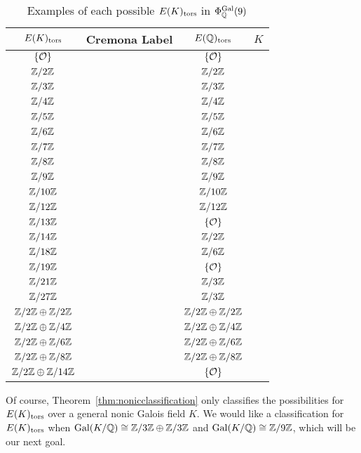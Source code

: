 	\begin{table}[!ht]
	\centering
	\caption{Examples of each possible $E(K)_\tors$ in $\Phi_\Q^{\Gal}(9)$\label{tab:completenoniclist}}
	\begin{tabular}{cccc} \hline
	 $E(K)_\tors$ & Cremona Label & $E(\Q)_\tors$ & $K$ \\ \hline
	$\{ \cO \}$ & \ooat{} & $\{ \cO \}$ & \qzetantp{} \\
	$\Z/2\Z$ & \ffafiv{} & $\Z/2\Z$ & \qzetantp{} \\
	$\Z/3\Z$ & \onao{} & $\Z/3\Z$ & \qzetantp{} \\
	$\Z/4\Z$ & \ofas{} & $\Z/4\Z$ & \qzetantp{} \\
	$\Z/5\Z$ & \ooao{} & $\Z/5\Z$ & \qzetantp{} \\
	$\Z/6\Z$ & \ofat{} & $\Z/6\Z$ & \qzetantp{} \\
	$\Z/7\Z$ & \tsbo{} & $\Z/7\Z$ & \qzetantp{} \\
	$\Z/8\Z$ & \ffafo{} & $\Z/8\Z$ & \qzetantp{} \\
	$\Z/9\Z$ & \ffbt{} & $\Z/9\Z$ & \qzetantp{} \\
	$\Z/10\Z$ & \ssco{} & $\Z/10\Z$ & \qzetantp{} \\
	$\Z/12\Z$ & \nzct{} & $\Z/12\Z$ & \qzetantp{} \\
	$\Z/13\Z$ & \ofsbo{} & $\{ \cO \}$ & \qzetantp{} \\
	$\Z/14\Z$ & \fnaf{} & $\Z/2\Z$ & \qzetantp{} \\
	$\Z/18\Z$ & \tszsozot{} & $\Z/6\Z$ & \nnezsb{} \\
	$\Z/19\Z$ & \tsoao{} & $\{ \cO \}$ & \qzetantp{} \\
	$\Z/21\Z$ & \ostbo{} & $\Z/3\Z$ & \nnstfttf{} \\
	$\Z/27\Z$ & \tsaf{} & $\Z/3\Z$ & \qzetatsp{} \\
	$\Z/2\Z \oplus \Z/2\Z$ & \ffat{} & $\Z/2\Z \oplus \Z/2\Z$ & \qzetantp{} \\
	$\Z/2\Z \oplus \Z/4\Z$ & \ffao{} & $\Z/2\Z \oplus \Z/4\Z$ & \qzetantp{} \\
	$\Z/2\Z \oplus \Z/6\Z$ & \tzat{} & $\Z/2\Z \oplus \Z/6\Z$ & \qzetantp{} \\
	$\Z/2\Z \oplus \Z/8\Z$ & \tozet{} & $\Z/2\Z \oplus \Z/8\Z$ & \qzetantp{} \\
	$\Z/2\Z \oplus \Z/14\Z$ & \onttco{} & $\{ \cO \}$ & \nnstfttfz{} \\
	\end{tabular}
	\end{table}


Of course, Theorem~\ref{thm:nonicclassification} only classifies the possibilities for $E(K)_\tors$ over a general nonic Galois field $K$. We would like a classification for $E(K)_\tors$ when $\Gal(K/\Q) \cong \Z/3\Z \oplus \Z/3\Z$ and $\Gal(K/\Q) \cong \Z/9\Z$, which will be our next goal. 





